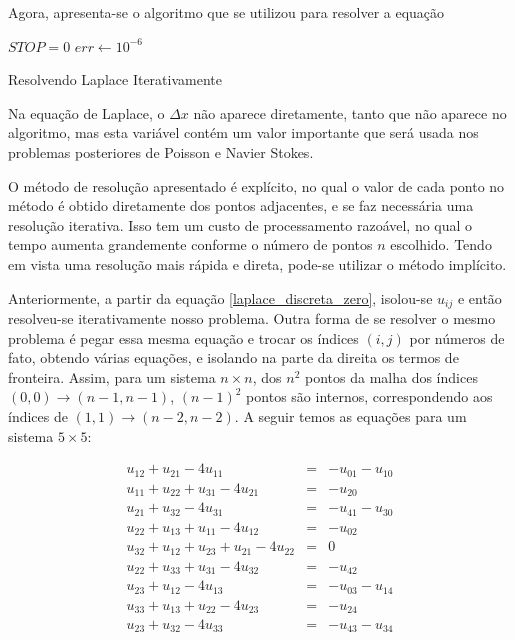 \documentclass[journal]{IEEEtran}
\begin{document}
Agora, apresenta-se o algoritmo que se utilizou para resolver a equação
\begin{algorithm}
\BlankLine
$STOP=0$\;
$err \leftarrow 10^{-6}$\;

\caption{Resolvendo Laplace Iterativamente}\label{algo_laplace_iter}
\end{algorithm}

Na equação de Laplace, o $\Delta x$ não aparece diretamente, tanto que não aparece no algoritmo, mas esta variável contém um valor importante que será usada nos problemas posteriores de Poisson e Navier Stokes.

O método de resolução apresentado é explícito, no qual o valor de cada ponto no método é obtido diretamente dos pontos adjacentes, e se faz necessária uma resolução iterativa. Isso tem um custo de processamento razoável, no qual o tempo aumenta grandemente conforme o número de pontos $n$ escolhido. Tendo em vista uma resolução mais rápida e direta, pode-se utilizar o método implícito.

Anteriormente, a partir da equação \ref{laplace_discreta_zero}, isolou-se $u_{ij}$ e então resolveu-se iterativamente nosso problema. Outra forma de se resolver o mesmo problema é pegar essa mesma equação e trocar os índices $(i,j)$ por números de fato, obtendo várias equações, e isolando na parte da direita os termos de fronteira. Assim, para um sistema $n\times n$, dos $n^2$ pontos da malha dos índices $(0,0)\rightarrow (n-1,n-1)$, $(n-1)^2$ pontos são internos, correspondendo aos índices de $(1,1)\rightarrow (n-2,n-2)$. A seguir temos as equações para um sistema $5\times 5$:

\begin{eqnarray}
u_{12}+u_{21} -4u_{11}& = & -u_{01}-u_{10} \nonumber \\
u_{11}+u_{22}+u_{31}-4u_{21}& =& -u_{20} \nonumber \\
u_{21}+u_{32}-4u_{31}&=&-u_{41}-u_{30} \nonumber \\
u_{22}+u_{13}+u_{11}-4u_{12}&=&-u_{02} \nonumber \\
u_{32}+u_{12}+u_{23}+u_{21}-4u_{22}&=&0 \nonumber \\
u_{22}+u_{33}+u_{31}-4u_{32}&=&-u_{42} \nonumber \\
u_{23}+u_{12}-4u_{13}&=&-u_{03}-u_{14} \nonumber \\
u_{33}+u_{13}+u_{22}-4u_{23}&=&-u_{24} \nonumber \\
u_{23}+u_{32}-4u_{33}&=&-u_{43}-u_{34} \nonumber
\end{eqnarray}
\end{document}
